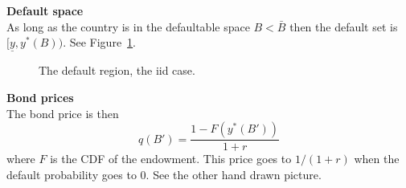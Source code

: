 \documentclass[11pt, pdftex]{article}
\begin{document}
\textbf{Default space}\\
As long as the country is in the defaultable space $B<\bar{B}$ then the default set is $[\underline{y},y^*(B))$.  See Figure~\ref{fig:dfs}.

\begin{figure}[ht]
\caption{The default region, the iid case.}
\label{fig:dfs}
\centering
{}
\end{figure}


\textbf{Bond prices}\\
The bond price is then
\begin{equation}
    q(B')=\frac{1-F\left(y^*\left(B' \right) \right)}{1+r}
\end{equation}
where $F$ is the CDF of the endowment. This price goes to $1/(1+r)$ when the default probability goes to 0.  See the other hand drawn picture.
\end{document}
